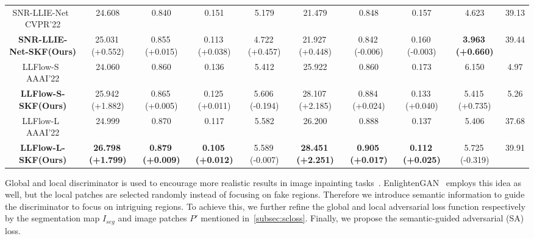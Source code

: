 \documentclass[10pt,twocolumn,letterpaper]{article}
\begin{document}
\begin{table*}[ht]
{\begin{tabular}{c|c|c|c|c|c|c|c|c|c}
    \midrule
    \midrule
    SNR-LLIE-Net~\cite{xu2022snr} \scriptsize CVPR'22 & 24.608  & 0.840  & 0.151  & 5.179   & 21.479  & 0.848  & 0.157     & 4.623     & 39.13 \\ \textbf{SNR-LLIE-Net-SKF(Ours)} & 25.031\,\footnotesize \textcolor{green1}{(+0.552)} & 0.855\,\footnotesize \textcolor{green1}{(+0.015)} & 0.113\,\footnotesize \textcolor{green1}{(+0.038)} & 4.722\,\footnotesize \textcolor{green1}{(+0.457)} & 21.927\,\footnotesize \textcolor{green1}{(+0.448)} & 0.842\,\footnotesize \textcolor{red1}{(-0.006)} & 0.160\,\footnotesize \textcolor{red1}{(-0.003)} & \textbf{3.963}\,\footnotesize \textcolor{green1}{\textbf{(+0.660)}} & 39.44  \\
    \midrule
    \midrule
    LLFlow-S~\cite{wang2022llflow} \scriptsize AAAI'22 & 24.060  & 0.860  & 0.136  & 5.412  & 25.922  & 0.860  & 0.173  & 6.150  & 4.97  \\ \textbf{LLFlow-S-SKF(Ours)} & 25.942\,\footnotesize \textcolor{green1}{(+1.882)} & 0.865\,\footnotesize \textcolor{green1}{(+0.005)} & 0.125\,\footnotesize \textcolor{green1}{(+0.011)} & 5.606\,\footnotesize \textcolor{red1}{(-0.194)} & 28.107\,\footnotesize \textcolor{green1}{(+2.185)} & 0.884\,\footnotesize \textcolor{green1}{(+0.024)} & 0.133\,\footnotesize \textcolor{green1}{(+0.040)} & 5.415\,\footnotesize \textcolor{green1}{(+0.735)} & 5.26  \\
    \midrule
    \midrule
    LLFlow-L~\cite{wang2022llflow} \scriptsize AAAI'22 & 24.999  & 0.870  & 0.117  & 5.582  & 26.200  & 0.888  & 0.137  & 5.406  & 37.68  \\ \textbf{LLFlow-L-SKF(Ours)} & \textbf{26.798}\,\footnotesize \textcolor{green1}{\textbf{(+1.799)}} & \textbf{0.879}\,\footnotesize \textcolor{green1}{\textbf{(+0.009)}} & \textbf{0.105}\,\footnotesize \textcolor{green1}{\textbf{(+0.012)}} & 5.589\,\footnotesize \textcolor{red1}{(-0.007)} & \textbf{28.451}\,\footnotesize \textcolor{green1}{\textbf{(+2.251)}} & \textbf{0.905}\,\footnotesize \textcolor{green1}{\textbf{(+0.017)}} & \textbf{0.112}\,\footnotesize \textcolor{green1}{\textbf{(+0.025)}} & 5.725\,\footnotesize \textcolor{red1}{(-0.319)} & 39.91  \\
    \bottomrule
    \end{tabular}}
  \label{tab:lollolv2}\vspace{-0.3cm}
\end{table*}

Global and local discriminator is used to encourage more realistic results in image inpainting tasks~\cite{li2017generative,iizuka2017globally}. EnlightenGAN~\cite{jiang2021enlightengan} employs this idea as well, but the local patches are selected randomly instead of focusing on fake regions. Therefore we introduce semantic information to guide the discriminator to focus on intriguing regions. To achieve this, we further refine the global and local adversarial loss function respectively by the segmentation map $I_{seg}$ and image patches $P'$ mentioned in~\cref{subsec:scloss}. Finally, we propose the semantic-guided adversarial (SA) loss.
\end{document}
